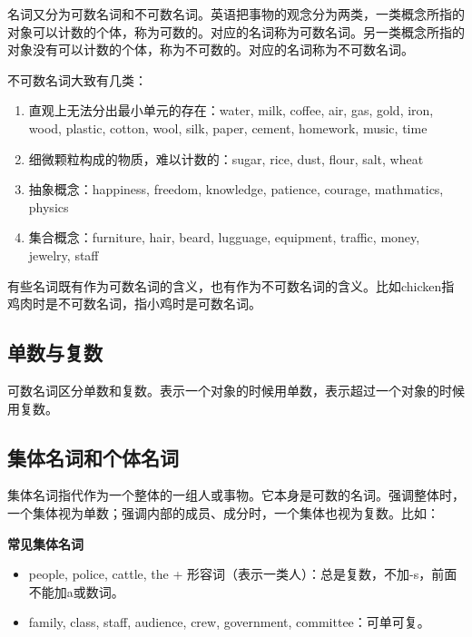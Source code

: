 \documentclass[10.5pt, a4paper]{ctexbook} %
\begin{document}
名词又分为可数名词和不可数名词。英语把事物的观念分为两类，一类概念所指的对象可以计数的个体，称为可数的。对应的名词称为可数名词。另一类概念所指的对象没有可以计数的个体，称为不可数的。对应的名词称为不可数名词。

不可数名词大致有几类：
\begin{enumerate}
    \item 直观上无法分出最小单元的存在：water, milk, coffee, air, gas, gold, iron, wood, plastic, cotton, wool, silk, paper, cement, homework, music, time
    \item 细微颗粒构成的物质，难以计数的：sugar, rice, dust, flour, salt, wheat
    \item 抽象概念：happiness, freedom, knowledge, patience, courage, mathmatics, physics
    \item 集合概念：furniture, hair, beard, lugguage, equipment, traffic, money, jewelry, staff
\end{enumerate}

有些名词既有作为可数名词的含义，也有作为不可数名词的含义。比如chicken指鸡肉时是不可数名词，指小鸡时是可数名词。

\subsection{单数与复数}

可数名词区分单数和复数。表示一个对象的时候用单数，表示超过一个对象的时候用复数。

\subsection{集体名词和个体名词}

集体名词指代作为一个整体的一组人或事物。它本身是可数的名词。强调整体时，一个集体视为单数；强调内部的成员、成分时，一个集体也视为复数。比如：

\begin{liju}
\end{liju}

\textbf{常见集体名词}

\begin{itemize}
    \item people, police, cattle, the + 形容词（表示一类人）：总是复数，不加-s，前面不能加a或数词。
    \item family, class, staff, audience, crew, government, committee：可单可复。
\end{itemize}
\end{document}

